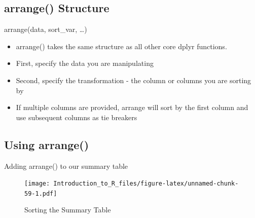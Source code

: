 \documentclass[]{book}
\newenvironment{Shaded}{\begin{snugshade}}{\end{snugshade}}
\newcommand{\DataTypeTok}[1]{\textcolor[rgb]{0.13,0.29,0.53}{#1}}
\newcommand{\KeywordTok}[1]{\textcolor[rgb]{0.13,0.29,0.53}{\textbf{#1}}}
\newcommand{\NormalTok}[1]{#1}
\newcommand{\OperatorTok}[1]{\textcolor[rgb]{0.81,0.36,0.00}{\textbf{#1}}}
\newcommand{\OtherTok}[1]{\textcolor[rgb]{0.56,0.35,0.01}{#1}}
\newcommand{\StringTok}[1]{\textcolor[rgb]{0.31,0.60,0.02}{#1}}
\providecommand{\tightlist}{%
  \setlength{\itemsep}{0pt}\setlength{\parskip}{0pt}}
\theoremstyle{definition}
\theoremstyle{definition}
\theoremstyle{definition}
\theoremstyle{remark}
\let\BeginKnitrBlock\begin \let\EndKnitrBlock\end
\begin{document}
\hypertarget{arrange-structure}{%
\subsection{arrange() Structure}\label{arrange-structure}}

arrange(data, sort\_var, \ldots{})

\begin{itemize}
\tightlist
\item
  arrange() takes the same structure as all other core dplyr functions.
\item
  First, specify the data you are manipulating
\item
  Second, specify the transformation - the column or columns you are sorting by
\item
  If multiple columns are provided, arrange will sort by the first column and use subsequent columns as tie breakers
\end{itemize}

\hypertarget{using-arrange}{%
\subsection{Using arrange()}\label{using-arrange}}

\BeginKnitrBlock{example}
\protect\hypertarget{exm:arr1}{}{\label{exm:arr1} }Adding arrange() to our summary table
\EndKnitrBlock{example}

\begin{Shaded}
\end{Shaded}

\begin{figure}
\centering
\texttt{[image: Introduction\_to\_R\_files/figure-latex/unnamed-chunk-59-1.pdf]}
\caption{\label{fig:unnamed-chunk-59}Sorting the Summary Table}
\end{figure}
\end{document}
